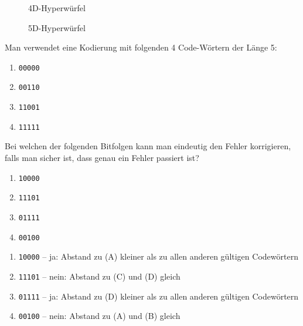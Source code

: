 \begin{figure}[H]
    \centering
    \caption{4D-Hyperwürfel}
    \label{fig:4d}
\end{figure}

\begin{figure}[H]
    \centering
    \caption{5D-Hyperwürfel}
    \label{fig:5d}
\end{figure}

\begin{myexercise}
    Man verwendet eine Kodierung mit folgenden 4 Code-Wörtern der Länge 5:
    \begin{enumerate}[label=(\Alph*)]
        \item \texttt{00000}
        \item \texttt{00110}
        \item \texttt{11001}
        \item \texttt{11111}
    \end{enumerate}

    Bei welchen der folgenden Bitfolgen kann man eindeutig den Fehler korrigieren, falls man sicher ist, dass genau ein Fehler passiert ist?
    \begin{enumerate}
        \item \texttt{10000}
        \item \texttt{11101}
        \item \texttt{01111}
        \item \texttt{00100}
    \end{enumerate}

    \begin{myanswer}
        \begin{enumerate}
            \item \texttt{10000} -- ja: Abstand zu (A) kleiner als zu allen anderen gültigen Codewörtern
            \item \texttt{11101} -- nein: Abstand zu (C) und (D) gleich
            \item \texttt{01111} -- ja: Abstand zu (D) kleiner als zu allen anderen gültigen Codewörtern
            \item \texttt{00100} -- nein: Abstand zu (A) und (B) gleich
        \end{enumerate}

    \end{myanswer}
\end{myexercise}



